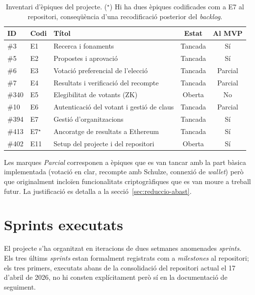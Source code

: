 \begin{table}[ht]
\centering
\small
\begin{tabular}{@{}llp{5cm}cc@{}}
\toprule
\textbf{ID} & \textbf{Codi} & \textbf{Títol} & \textbf{Estat} & \textbf{Al MVP} \\
\midrule
\#3   & E1  & Recerca i fonaments                       & Tancada & Sí \\
\#5   & E2  & Propostes i aprovació                      & Tancada & Sí \\
\#6   & E3  & Votació preferencial de l'elecció          & Tancada & Parcial \\
\#7   & E4  & Resultats i verificació del recompte       & Tancada & Parcial \\
\#340 & E5  & Elegibilitat de votants (\acs{ZK})         & Oberta  & No \\
\#10  & E6  & Autenticació del votant i gestió de claus  & Tancada & Parcial \\
\#394 & E7  & Gestió d'organitzacions                    & Tancada & Sí \\
\#413 & E7$^{\star}$ & Ancoratge de resultats a Ethereum & Tancada & Sí \\
\#402 & E11 & Setup del projecte i del repositori        & Oberta  & Sí \\
\bottomrule
\end{tabular}
\caption[Inventari d'èpiques]{Inventari d'èpiques del projecte. ($^{\star}$) Hi
ha dues èpiques codificades com a E7 al repositori, conseqüència d'una
recodificació posterior del \emph{backlog}.}
\label{tab:epiques}
\end{table}

Les marques \emph{Parcial} corresponen a èpiques que es van tancar amb la
part bàsica implementada (votació en clar, recompte amb Schulze, connexió de
\emph{wallet}) però que originalment incloïen funcionalitats criptogràfiques
que es van moure a treball futur. La justificació es detalla a la
secció~\ref{sec:reduccio-abast}.

\section{Sprints executats}
\label{sec:sprints}

El projecte s'ha organitzat en iteracions de dues setmanes anomenades
\emph{sprints}. Els tres últims \emph{sprints} estan formalment registrats com
a \emph{milestones} al repositori; els tres primers, executats abans de la
consolidació del repositori actual el 17 d'abril de 2026, no hi consten
explícitament però sí en la documentació de seguiment.

